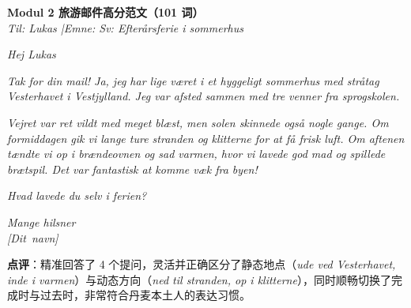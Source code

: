 \begin{answerbox}
\textbf{Modul 2 旅游邮件高分范文（101 词）}\\
\textit{Til: Lukas \quad|\quad Emne: Sv: Efterårsferie i sommerhus}

\textit{Hej Lukas}

\textit{Tak for din mail! Ja, jeg har lige været i et hyggeligt sommerhus med stråtag  Vesterhavet i Vestjylland. Jeg var afsted sammen med tre venner fra sprogskolen.}

\textit{Vejret var ret vildt med meget blæst, men solen skinnede også nogle gange. Om formiddagen gik vi lange ture  stranden og  klitterne for at få frisk luft. Om aftenen tændte vi op i brændeovnen og sad  varmen, hvor vi lavede god mad og spillede brætspil. Det var fantastisk at komme væk fra byen!}

\textit{Hvad lavede du selv i ferien?}

\textit{Mange hilsner\\
\mbox{[Dit navn]}}

\small\textbf{点评}：精准回答了 4 个提问，灵活并正确区分了静态地点（\textit{ude ved Vesterhavet, inde i varmen}）与动态方向（\textit{ned til stranden, op i klitterne}），同时顺畅切换了完成时与过去时，非常符合丹麦本土人的表达习惯。
\end{answerbox}
